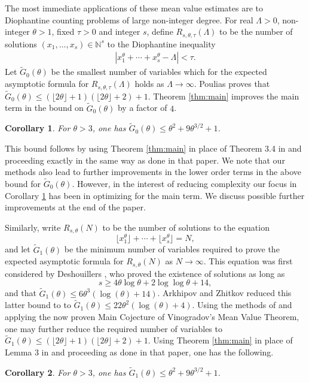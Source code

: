 \documentclass[11pt,reqno]{amsart}
\newtheorem{corollary}{Corollary}[section]
\numberwithin{equation}{section}
\begin{document}
The most immediate applications of these mean value estimates are to Diophantine counting problems of large non-integer degree. For real $\Lambda > 0$, non-integer $\theta > 1$, fixed $\tau > 0$ and integer $s$, define $R_{s,\theta,\tau}(\Lambda)$ to be the number of solutions $(x_1,\ldots,x_s) \in \mathbb{N}^s$ to the Diophantine inequality 
\begin{align} \label{eq:maindioph}
|x_1^{\theta}+\cdots+x_s^{\theta}-\Lambda| < \tau. 
\end{align}
Let $\widetilde{G}_0(\theta)$ be the smallest number of variables which for the expected asymptotic formula for $R_{s,\theta,\tau}(\Lambda)$ holds as $\Lambda \to \infty$. 
Poulias \cite{Poulias1} proves that $\widetilde{G}_0(\theta) \leq (\lfloor 2\theta \rfloor+1)(\lfloor 2\theta \rfloor +2)+1$.  
Theorem \ref{thm:main} improves the main term in the bound on $\widetilde{G}_0(\theta)$ by a factor of $4$. 
\begin{corollary} \label{cor:Gbound}
For $\theta > 3$, one has $\widetilde{G}_0(\theta) \leq \theta^2+9\theta^{3/2}+1$. 
\end{corollary}
This bound follows by using Theorem \ref{thm:main} in place of Theorem 3.4 in \cite{Poulias1} and proceeding exactly in the same way as done in that paper. 
We note that our methods also lead to further improvements in the lower order terms in the above bound for $\widetilde{G}_0(\theta)$. However, in the interest of reducing complexity our focus in Corollary \ref{cor:Gbound} has been in optimizing for the main term. We discuss possible further improvements at the end of the paper. 

Similarly, write $R_{s,\theta}(N)$ to be the number of solutions to the equation 
\[ \lfloor x_1^{\theta}\rfloor+\cdots+\lfloor x_s^{\theta} \rfloor = N, \]
and let $\widetilde{G}_1(\theta)$ be the minimum number of variables required to prove the expected asymptotic formula for $R_{s,\theta}(N)$ as $N \to \infty$. 
This equation was first considered by Deshouillers \cite{Des}, who proved the existence of solutions as long as 
\[ s \geq 4\theta \log\theta+2\log\log\theta+14, \]
and that $\widetilde{G}_1(\theta) \leq 6\theta^{3}(\log(\theta)+14)$. Arkhipov and Zhitkov \cite{ArkhZhit} reduced this latter bound to to $\widetilde{G}_1(\theta) \leq 22\theta^2(\log(\theta)+4)$. Using the methods of \cite{Poulias1} and applying the now proven Main Cojecture of Vinogradov's Mean Value Theorem, one may further reduce the required number of variables to $\widetilde{G}_1(\theta) \leq (\lfloor 2\theta \rfloor+1)(\lfloor 2\theta \rfloor +2)+1$. Using Theorem \ref{thm:main} in place of Lemma 3 in \cite{ArkhZhit} and proceeding as done in that paper, one has the following. 
\begin{corollary} \label{cor:Gbound2}
For $\theta > 3$, one has $\widetilde{G}_1(\theta) \leq \theta^2+9\theta^{3/2}+1$. 
\end{corollary}
\end{document}

